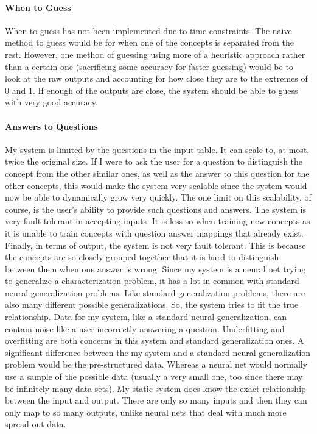 \documentclass[12pt]{article}
\begin{document}
\paragraph*{When to Guess}
When to guess has not been implemented due to time constraints. The naive method to guess would be for when one of the concepts is separated from the rest. However, one method of guessing using more of a heuristic approach rather than a certain one (sacrificing some accuracy for faster guessing) would be to look at the raw outputs and accounting for how close they are to the extremes of 0 and 1. If enough of the outputs are close, the system should be able to guess with very good accuracy.

\paragraph*{Answers to Questions}
My system is limited by the questions in the input table. It can scale to, at most, twice the original size. If I were to ask the user for a question to distinguish the concept from the other similar ones, as well as the answer to this question for the other concepts, this would make the system very scalable since the system would now be able to dynamically grow very quickly. The one limit on this scalability, of course, is the user's ability to provide such questions and answers.
The system is very fault tolerant in accepting inputs. It is less so when training new concepts as it is unable to train concepts with question answer mappings that already exist. Finally, in terms of output, the system is not very fault tolerant. This is because the concepts are so closely grouped together that it is hard to distinguish between them when one answer is wrong.
 Since my system is a neural net trying to generalize a characterization problem, it has a lot in common with standard neural generalization problems. Like standard generalization problems, there are also many different possible generalizations. So, the system tries to fit the true relationship. Data for my system, like a standard neural generalization, can contain noise like a user incorrectly answering a question. Underfitting and overfitting are both concerns in this system and standard generalization ones. A significant difference between the my system and a standard neural generalization problem would be the pre-structured data. Whereas a neural net would normally use a sample of the possible data (usually a very small one, too since there may be infinitely many data sets). My static system does know the exact relationship between the input and output. There are only so many inputs and then they can only map to so many outputs, unlike neural nets that deal with much more spread out data. 
\end{document}
